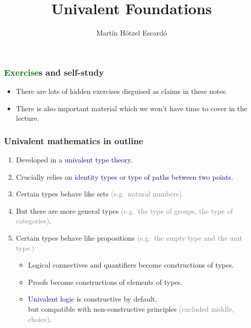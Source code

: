 \documentclass[aspectratio=169]{beamer}
\title{{\Large Univalent Foundations}}
\author{Mart\'in H\"otzel Escard\'o}
\institute{University of Birmingham, UK}
\date{\small \dg{UniMath School, Birmingham, UK, December 2017}}
\newcommand{\db}{\textcolor{darkblue}}
\newcommand{\dg}{\textcolor{darkgreen}}
\newcommand{\grey}{\textcolor{grey}}
\begin{document}
\begin{frame}
  \titlepage
\end{frame}

\begin{frame}
  \frametitle{\dg{Exercise}s and self-study}

  \begin{itemize}
  \vfill \item 
  There are lots of hidden exercises disguised as claims in these notes.

  \vfill
  \item There is also important material which we won't have time to cover in the lecture.
  \end{itemize}

\end{frame}

\begin{frame}
  \frametitle{Univalent mathematics in outline}

  \begin{enumerate}
  \vfill \item Developed in a \db{univalent type theory}.
  \vfill \item Crucially relies on \db{identity types} or \db{type of paths between two points}.
  \vfill \item Certain types behave like sets \grey{(e.g.\ natural numbers).}
  \vfill \item But there are more general types \grey{(e.g.\ the type of groups, the type of categories)}.
  \vfill \item Certain types behave like propositions \grey{(e.g.\ the empty type and the unit type.)}
    \begin{itemize}
    \vfill \item Logical connectives and quantifiers become constructions of types.
  \vfill \item Proofs become constructions of elements of types.
  \vfill \item \db{Univalent logic} is constructive by default,
        \\ but compatible with non-constructive principles \grey{(excluded middle, choice)}.
        \end{itemize}
  \end{enumerate}

\end{frame}
\end{document}
